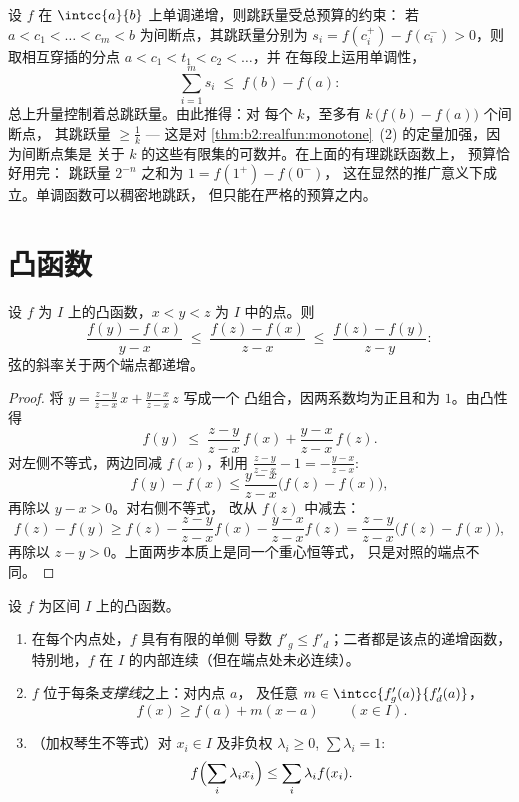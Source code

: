 \begin{example}[跳跃量不超过上升量]\label{ex:b2:realfun:jumpbudget}
设 $f$ 在 $\intcc{a}{b}$ 上单调递增，则跳跃量受总预算的约束：
若 $a < c_1 < \dots < c_m < b$ 为间断点，其跳跃量分别为
$s_i = f(c_i^+) - f(c_i^-) > 0$，则取相互穿插的分点
$a < c_1 < t_1 < c_2 < \dots$，并
在每段上运用单调性，
\[
\sum_{i=1}^{m} s_i \;\leq\; f(b) - f(a) :
\]
总上升量控制着总跳跃量。由此推得：对
每个 $k$，至多有 $k\,\bigl(f(b) - f(a)\bigr)$ 个间断点，
其跳跃量 $\geq \frac1k$ --- 这是对
\cref{thm:b2:realfun:monotone}~(2) 的定量加强，因为间断点集是
关于 $k$ 的这些有限集的可数并。在上面的有理跳跃函数上，
预算恰好用完：
跳跃量 $2^{-n}$ 之和为 $1 = f(1^+) - f(0^-)$，
这在显然的推广意义下成立。单调函数可以稠密地跳跃，
但只能在严格的预算之内。
\end{example}

\section{凸函数}

\begin{lemma}[斜率不等式]\label{lem:b2:realfun:slopes}
设 $f$ 为 $I$ 上的凸函数，$x < y < z$ 为 $I$ 中的点。则
\[
\frac{f(y) - f(x)}{y - x}
\;\leq\; \frac{f(z) - f(x)}{z - x}
\;\leq\; \frac{f(z) - f(y)}{z - y} :
\]
弦的斜率关于两个端点都递增。
\end{lemma}

\begin{proof}
将 $y = \frac{z - y}{z - x}\,x + \frac{y - x}{z - x}\,z$ 写成一个
凸组合，因两系数均为正且和为
$1$。由凸性得
\[
f(y) \;\leq\; \frac{z-y}{z-x}\,f(x) + \frac{y-x}{z-x}\,f(z).
\]
对左侧不等式，两边同减 $f(x)$，利用
$\frac{z-y}{z-x} - 1 = -\frac{y-x}{z-x}$:
\[
f(y) - f(x) \leq \frac{y - x}{z - x}\bigl(f(z) - f(x)\bigr),
\]
再除以 $y - x > 0$。对右侧不等式，
改从 $f(z)$ 中减去：
\[
f(z) - f(y) \geq f(z) - \frac{z-y}{z-x}f(x) -
\frac{y-x}{z-x}f(z)
= \frac{z - y}{z - x}\bigl(f(z) - f(x)\bigr),
\]
再除以 $z - y > 0$。上面两步本质上是同一个重心恒等式，
只是对照的端点不同。
\end{proof}

\begin{theorem}[凸函数的正则性]\label{thm:b2:realfun:convexreg}
设 $f$ 为区间 $I$ 上的凸函数。
\begin{enumerate}
  \item 在每个内点处，$f$ 具有有限的单侧
        导数 $f'_g \leq f'_d$；二者都是该点的递增函数，
        特别地，$f$ 在
        $I$ 的内部连续（但在端点处未必连续）。
  \item $f$ 位于每条\emph{支撑线}之上：对内点 $a$，
        及任意 $m \in \intcc{f'_g(a)}{f'_d(a)}$，
        \[
        f(x) \geq f(a) + m(x - a) \qquad (x \in I).
        \]
  \item （加权琴生不等式）对 $x_i \in I$ 及非负权 $\lambda_i
        \geq 0$, $\sum\lambda_i = 1$:
        \[
        f\Bigl(\sum_i \lambda_i x_i\Bigr) \leq \sum_i \lambda_i
        f(x_i) .\index{Jensen's inequality}
        \]
\end{enumerate}
\end{theorem}


